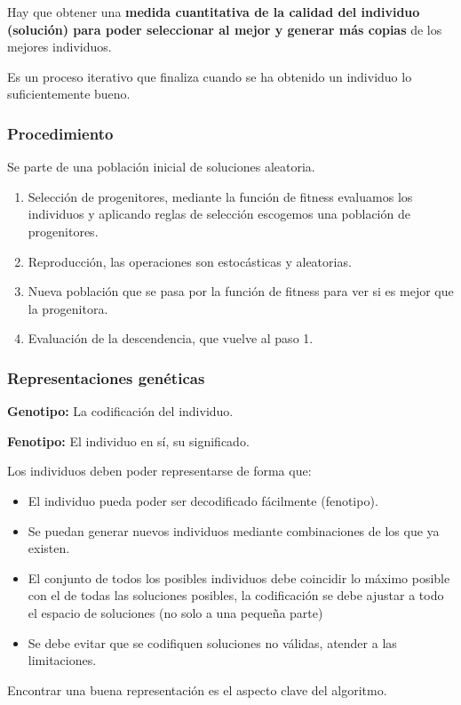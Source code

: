 \documentclass[12pt, twoside, openright]{report} %
\begin{document}
Hay que obtener una \textbf{medida cuantitativa de la calidad del individuo (solución) para poder seleccionar al mejor y generar más copias} de los mejores individuos.

Es un proceso iterativo que finaliza cuando se ha obtenido un individuo lo suficientemente bueno.

\subsubsection{Procedimiento}
Se parte de una población inicial de soluciones aleatoria.
\begin{enumerate}
	\item Selección de progenitores, mediante la función de fitness evaluamos los individuos y aplicando reglas de selección escogemos una población de progenitores.
	\item Reproducción, las operaciones son estocásticas y aleatorias.
	\item Nueva población que se pasa por la función de fitness para ver si es mejor que la progenitora.
	\item Evaluación de la descendencia, que vuelve al paso 1.
\end{enumerate}

\subsubsection{Representaciones genéticas}
\textbf{Genotipo:} La codificación del individuo.

\textbf{Fenotipo:} El individuo en sí, su significado.
\pagebreak

Los individuos deben poder representarse de forma que:
\begin{itemize}
	\item El individuo pueda poder ser decodificado fácilmente (fenotipo).
	\item Se puedan generar nuevos individuos mediante combinaciones de los que ya existen.
	\item El conjunto de todos los posibles individuos debe coincidir lo máximo posible con el de todas las soluciones posibles, la codificación se debe ajustar a todo el espacio de soluciones (no solo a una pequeña parte)
	\item Se debe evitar que se codifiquen soluciones no válidas, atender a las limitaciones.
\end{itemize}
Encontrar una buena representación es el aspecto clave del algoritmo.
\end{document}
